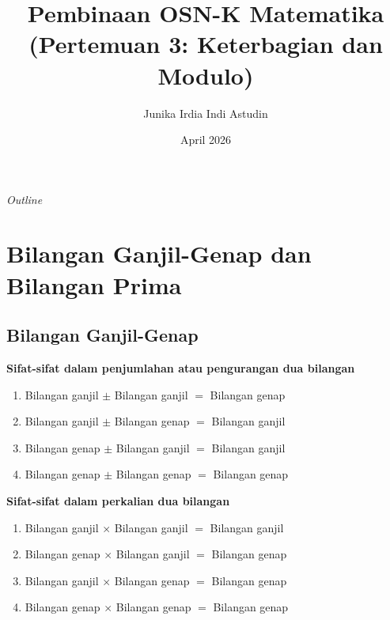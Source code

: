 \documentclass[aspectratio=169]{beamer}
\date{April 2026}
\title[OSK Matematika - T1,T2]{Pembinaan OSN-K Matematika\\(Pertemuan 3: Keterbagian dan Modulo)}
\author[Junika]{Junika Irdia Indi Astudin}
\institute[MAN 1 Pasuruan]{MAN 1 Pasuruan}
\theoremstyle{definition}
\begin{document}
\begin{frame}
  \titlepage
\end{frame}

\begin{frame}{\textit{Outline}}
  \tableofcontents
\end{frame}
\section{Bilangan Ganjil-Genap dan Bilangan Prima}
\subsection{Bilangan Ganjil-Genap}
\begin{frame}{\insertsection}{\insertsubsection}
  \textbf{Sifat-sifat dalam penjumlahan atau pengurangan dua bilangan}
  \begin{enumerate}
    \item Bilangan ganjil $\pm$ Bilangan ganjil $ = $ Bilangan genap
    \item Bilangan ganjil $\pm$ Bilangan genap $ = $ Bilangan ganjil
    \item Bilangan genap $\pm$ Bilangan ganjil $ = $ Bilangan ganjil
    \item Bilangan genap $\pm$ Bilangan genap $ = $ Bilangan genap
  \end{enumerate}
  \textbf{Sifat-sifat dalam perkalian dua bilangan}
  \begin{enumerate}
    \item Bilangan ganjil $\times$ Bilangan ganjil $ = $ Bilangan ganjil
    \item Bilangan genap $\times$ Bilangan ganjil $ = $ Bilangan genap
    \item Bilangan ganjil $\times$ Bilangan genap $ = $ Bilangan genap
    \item Bilangan genap $\times$ Bilangan genap $ = $ Bilangan genap
  \end{enumerate}
\end{frame}
\end{document}

